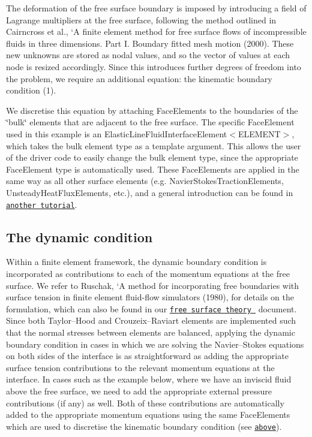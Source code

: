 The deformation of the free surface boundary is imposed by introducing a field of Lagrange multipliers at the free surface, following the method outlined in Cairncross et al., `A finite element method for free surface flows of incompressible fluids in three dimensions. Part I. Boundary fitted mesh motion\textquotesingle{} (2000). These new unknowns are stored as nodal values, and so the vector of values at each node is resized accordingly. Since this introduces further degrees of freedom into the problem, we require an additional equation\+: the kinematic boundary condition (1).

We discretise this equation by attaching {\ttfamily Face\+Elements} to the boundaries of the \char`\"{}bulk\char`\"{} elements that are adjacent to the free surface. The specific {\ttfamily Face\+Element} used in this example is an {\ttfamily Elastic\+Line\+Fluid\+Interface\+Element$<$\+E\+L\+E\+M\+E\+N\+T$>$}, which takes the bulk element type as a template argument. This allows the user of the driver code to easily change the bulk element type, since the appropriate {\ttfamily Face\+Element} type is automatically used. These {\ttfamily Face\+Elements} are applied in the same way as all other surface elements (e.\+g. {\ttfamily Navier\+Stokes\+Traction\+Elements}, {\ttfamily Unsteady\+Heat\+Flux\+Elements}, etc.), and a general introduction can be found in \href{../../../poisson/two_d_poisson_flux_bc/html/index.html#create_flux}{\tt another tutorial}.\hypertarget{index_dynamic_condition_implementation}{}\subsection{The dynamic condition}\label{index_dynamic_condition_implementation}
Within a finite element framework, the dynamic boundary condition is incorporated as contributions to each of the momentum equations at the free surface. We refer to Ruschak, `A method for incorporating free boundaries with surface tension in finite element fluid-\/flow simulators\textquotesingle{} (1980), for details on the formulation, which can also be found in our \href{../../surface_theory/html/index.html#boundary_conditions}{\tt free surface theory } document. Since both Taylor--Hood and Crouzeix--Raviart elements are implemented such that the normal stresses between elements are balanced, applying the dynamic boundary condition in cases in which we are solving the Navier--Stokes equations on both sides of the interface is as straightforward as adding the appropriate surface tension contributions to the relevant momentum equations at the interface. In cases such as the example below, where we have an inviscid fluid above the free surface, we need to add the appropriate external pressure contributions (if any) as well. Both of these contributions are automatically added to the appropriate momentum equations using the same {\ttfamily Face\+Elements} which are used to discretise the kinematic boundary condition (see \href{#kinematic_condition_implementation}{\tt above}).


